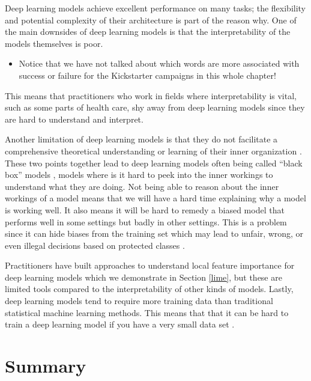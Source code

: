 \documentclass[
]{krantz}
\newenvironment{rmdblock}[1]
  {\begin{shaded*}
  \begin{itemize}[left = -1cm, labelsep = 1cm]
  \renewcommand{\labelitemi}{
    \raisebox{-.7\height}[0pt][0pt]{
      {\setkeys{Gin}{width=3em,keepaspectratio}\texttt{[image: images/\#1]}}
    }
  }
 
  \item
  }
  {
  \end{itemize}
  \end{shaded*}
  }
\newenvironment{rmdwarning}
  {\begin{rmdblock}{warning}}
  {\end{rmdblock}}
\begin{document}
Deep learning models achieve excellent performance on many tasks; the flexibility and potential complexity of their architecture is part of the reason why. One of the main downsides of deep learning models is that the interpretability of the models themselves is poor.

\begin{rmdwarning}
Notice that we have not talked about which words are more associated
with success or failure for the Kickstarter campaigns in this whole
chapter!
\end{rmdwarning}

This means that practitioners who work in fields where interpretability is vital, such as some parts of health care, shy away from deep learning models since they are hard to understand and interpret.

Another limitation of deep learning models is that they do not facilitate a comprehensive theoretical understanding or learning of their inner organization \citep{shwartzziv2017opening}.
These two points together lead to deep learning models often being called ``black box'' models \citep{shrikumar2019learning}, models where is it hard to peek into the inner workings to understand what they are doing.
Not being able to reason about the inner workings of a model means that we will have a hard time explaining why a model is working well. It also means it will be hard to remedy a biased model that performs well in some settings but badly in other settings.
This is a problem since it can hide biases from the training set which may lead to unfair, wrong, or even illegal decisions based on protected classes \citep{guidotti2018survey}.

Practitioners have built approaches to understand local feature importance for deep learning models which we demonstrate in Section \ref{lime}, but these are limited tools compared to the interpretability of other kinds of models.
Lastly, deep learning models tend to require more training data than traditional statistical machine learning methods. This means that that it can be hard to train a deep learning model if you have a very small data set \citep{lampinen2018oneshot}.

\hypertarget{dldnnsummary}{%
\section{Summary}\label{dldnnsummary}}
\end{document}
